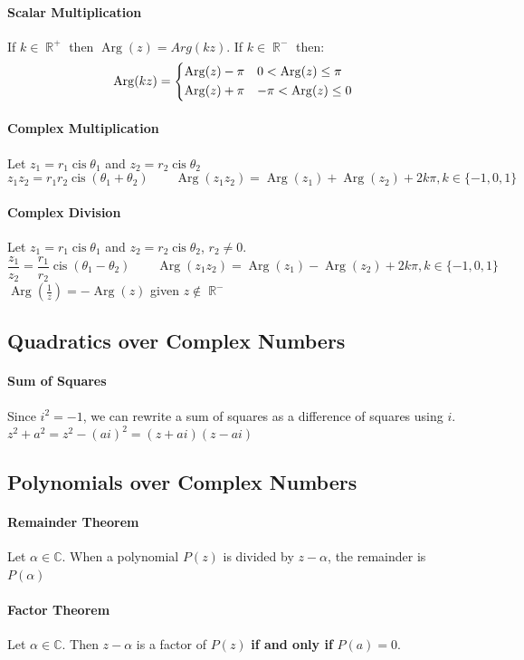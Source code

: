 \documentclass[a4paper,twoside,10pt]{article}
\DeclareMathOperator\cis{cis}
\DeclareMathOperator\Arg{Arg}
\DeclareMathOperator\R{\mathbb{R}}
\begin{document}
			\paragraph{Scalar Multiplication} If $k\in\R^+$ then $\Arg(z)=Arg(kz)$. If $k\in\R^-$ then:
			\[
				\Arg(kz)=\begin{cases*}
					\Arg(z)-\pi & $0<\Arg(z)\leq\pi$ \\
					\Arg(z)+\pi & $-\pi<\Arg(z)\leq0$
				\end{cases*}
			\]
			\paragraph{Complex Multiplication} Let $z_1=r_1\cis\theta_1$ and $z_2=r_2\cis\theta_2$
			\[
				z_1z_2=r_1r_2\cis(\theta_1+\theta_2) \qquad \Arg(z_1z_2)=\Arg(z_1)+\Arg(z_2)+2k\pi,k\in\{-1,0,1\}
			\]
			\paragraph{Complex Division} Let $z_1=r_1\cis\theta_1$ and $z_2=r_2\cis\theta_2$, $r_2\neq0$.
			\[
				\frac{z_1}{z_2}=\frac{r_1}{r_2}\cis\left(\theta_1-\theta_2\right) \qquad \Arg(z_1z_2)=\Arg(z_1)-\Arg(z_2)+2k\pi,k\in\{-1,0,1\}
			\]
			$\Arg(\frac{1}{z})=-\Arg(z)$ given $z\notin\R^-$
		\subsection{Quadratics over Complex Numbers}
			\paragraph{Sum of Squares} Since $i^2=-1$, we can rewrite a sum of squares as a difference of squares using $i$. $z^2+a^2=z^2-(ai)^2=(z+ai)(z-ai)$
		\subsection{Polynomials over Complex Numbers}
			\paragraph{Remainder Theorem} Let $\alpha\in\mathbb{C}$. When a polynomial $P(z)$ is divided by $z-\alpha$, the remainder is $P(\alpha)$
			\paragraph{Factor Theorem} Let $\alpha\in\mathbb{C}$. Then $z-\alpha$ is a factor of $P(z)$ \textbf{if and only if} $P(a)=0$.
\end{document}
